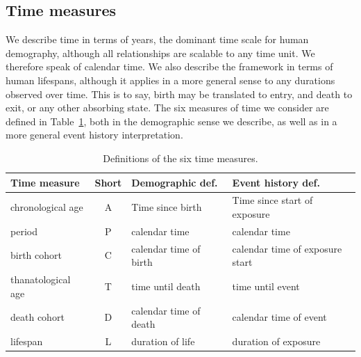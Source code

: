 \documentclass[12pt,oneside,a4paper]{article} %
\begin{document}

\FloatBarrier
\subsection{Time measures}
\FloatBarrier
We describe time in terms of years, the dominant time scale for human
demography, although all relationships are scalable to any time unit. We therefore speak of calendar time. We also describe the framework in terms
of human lifespans, although it applies in a more general sense to any durations
observed over time. This is to say, birth may be translated to entry, and death
to exit, or any other absorbing state. The six measures of time we consider are
defined in Table~\ref{tab:sixdefs}, both in the demographic sense we describe, as well as in a more general event history interpretation.

\FloatBarrier
\begin{table}[ht!]
\centering
\caption{Definitions of the six time measures.}
\label{tab:sixdefs}
\begin{adjustwidth}{0em}{0em}
\begin{tabular}{lcll}
\hline 
\textbf{Time measure} & \textbf{Short} & \textbf{Demographic def.} &
\textbf{Event history def.}\\
\hline 
chronological age & A & Time since birth & Time since start of exposure \\
period & P & calendar time & calendar time \\
birth cohort & C & calendar time of birth & calendar time of exposure start \\
thanatological age & T & time until death & time until event \\
death cohort & D & calendar time of death & calendar time of event \\
lifespan & L & duration of life & duration of exposure \\
\end{tabular}
\end{adjustwidth}
\end{table}
\end{document}
